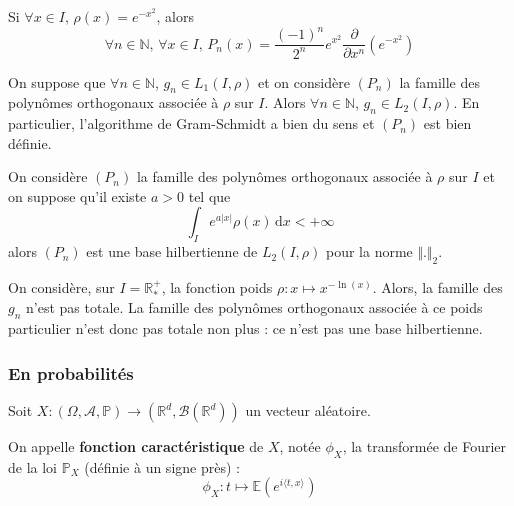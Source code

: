	\begin{example}
		Si $\forall x \in I, \, \rho(x) = e^{-x^2}$, alors
		\[ \forall n \in \mathbb{N}, \, \forall x \in I, \, P_n(x) = \frac{(-1)^n}{2^n} e^{x^2} \frac{\partial}{\partial x^n} \left( e^{-x^2} \right) \] 
	\end{example}
	
	
	\begin{lemma}
		On suppose que $\forall n \in \mathbb{N}$, $g_n \in L_1(I, \rho)$ et on considère $(P_n)$ la famille des polynômes orthogonaux associée à $\rho$ sur $I$. Alors $\forall n \in \mathbb{N}$, $g_n \in L_2(I, \rho)$. En particulier, l'algorithme de Gram-Schmidt a bien du sens et $(P_n)$ est bien définie.
	\end{lemma}
	
	
	\begin{application}
		On considère $(P_n)$ la famille des polynômes orthogonaux associée à $\rho$ sur $I$ et on suppose qu'il existe $a > 0$ tel que
		\[ \int_I e^{a \vert x \vert} \rho(x) \, \mathrm{d}x < +\infty \]
		alors $(P_n)$ est une base hilbertienne de $L_2(I, \rho)$ pour la norme $\Vert . \Vert_2$.
	\end{application}
	
	\begin{cexample}
		On considère, sur $I = \mathbb{R}^+_*$, la fonction poids $\rho : x \mapsto x^{-\ln(x)}$. Alors, la famille des $g_n$ n'est pas totale. La famille des polynômes orthogonaux associée à ce poids particulier n'est donc pas totale non plus : ce n'est pas une base hilbertienne.
	\end{cexample}
	
	\subsubsection{En probabilités}
	
	
	Soit $X : (\Omega, \mathcal{A}, \mathbb{P}) \rightarrow (\mathbb{R}^d, \mathcal{B}(\mathbb{R}^d))$ un vecteur aléatoire.
	
	\begin{definition}
		On appelle \textbf{fonction caractéristique} de $X$, notée $\phi_X$, la transformée de Fourier de la loi $\mathbb{P}_X$ (définie à un signe près) :
		\[ \phi_X : t \mapsto \mathbb{E}(e^{i \langle t, x \rangle}) \]
	\end{definition}
	
